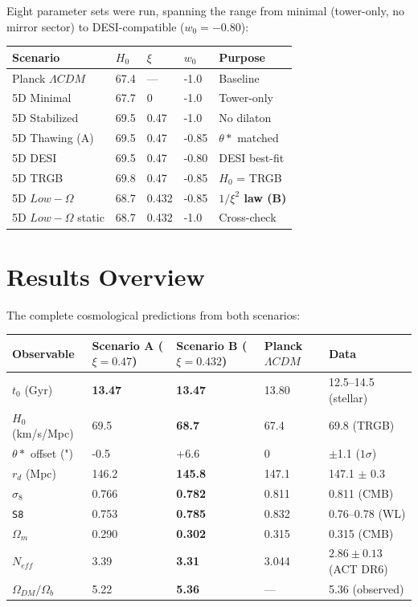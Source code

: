 \documentclass[aps,prd,preprint,superscriptaddress,longbibliography]{revtex4-2}
\begin{document}
Eight parameter sets were run, spanning the range from minimal (tower-only, no mirror sector) to DESI-compatible ($w_{0} = -0.80$):


\begin{table}[H]
\begin{ruledtabular}
\begin{tabular}{p{3.0cm}p{3.0cm}p{3.0cm}p{3.0cm}p{3.0cm}}
Scenario & $H_{0}$ & $\xi$ & $w_{0}$ & Purpose \\
\hline
Planck $\Lambda CDM$ & 67.4 & --- & -1.0 & Baseline \\
5D Minimal & 67.7 & 0 & -1.0 & Tower-only \\
5D Stabilized & 69.5 & 0.47 & -1.0 & No dilaton \\
5D Thawing (A) & 69.5 & 0.47 & -0.85 & $\theta*$ matched \\
5D DESI & 69.5 & 0.47 & -0.80 & DESI best-fit \\
5D TRGB & 69.8 & 0.47 & -0.85 & $H_{0}$ = TRGB \\
5D $Low-\Omega$ & 68.7 & 0.432 & -0.85 & \textbf{$1/\xi^{2}$ law (B)} \\
5D $Low-\Omega$ static & 68.7 & 0.432 & -1.0 & Cross-check \\
\end{tabular}
\end{ruledtabular}
\end{table}



\section{Results Overview}

The complete cosmological predictions from both scenarios:


\begin{table}[H]
\begin{ruledtabular}
\begin{tabular}{p{3.0cm}p{3.0cm}p{3.0cm}p{3.0cm}p{3.0cm}}
Observable & Scenario A ($\xi=0.47$) & Scenario B ($\xi=0.432$) & Planck $\Lambda CDM$ & Data \\
\hline
$t_{0}$ (Gyr) & \textbf{13.47} & \textbf{13.47} & 13.80 & 12.5--14.5 (stellar) \\
$H_{0}$ (km/s/Mpc) & 69.5 & \textbf{68.7} & 67.4 & 69.8 (TRGB) \\
$\theta*$ offset (") & -0.5 & +6.6 & 0 & $\pm$1.1 ($1\sigma$) \\
$r_d$ (Mpc) & 146.2 & \textbf{145.8} & 147.1 & 147.1 $\pm$ 0.3 \\
$\sigma_{8}$ & 0.766 & \textbf{0.782} & 0.811 & 0.811 (CMB) \\
\texttt{S8} & 0.753 & \textbf{0.785} & 0.832 & 0.76--0.78 (WL) \\
$\Omega_m$ & 0.290 & \textbf{0.302} & 0.315 & 0.315 (CMB) \\
$N_{eff}$ & 3.39 & \textbf{3.31} & 3.044 & $2.86\pm0.13$ (ACT DR6) \\
$\Omega_{DM}/\Omega_b$ & 5.22 & \textbf{5.36} & --- & 5.36 (observed) \\
\end{tabular}
\end{ruledtabular}
\end{table}
\end{document}
